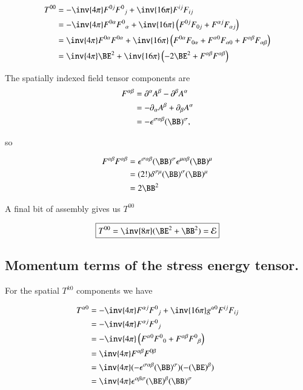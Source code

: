 \begin{align*}
T^{ 0 0 } 
&=
-\inv{4 \pi} F^{ 0 j} {F^0}_j + \inv{16 \pi} F^{i j} F_{i j} \\
&=
-\inv{4 \pi} F^{ 0 \alpha} {F^0}_\alpha + \inv{16 \pi} \left(
F^{0 j} F_{0 j} 
+F^{\alpha j} F_{\alpha j} 
\right)
\\
&=
\inv{4 \pi} F^{ 0 \alpha} F^{0 \alpha} + \inv{16 \pi} 
\left(
F^{0 \alpha} F_{0 \alpha} 
+F^{\alpha 0} F_{\alpha 0} 
+F^{\alpha \beta} F_{\alpha \beta} 
\right)
\\
&=
\inv{4 \pi} \BE^2 + \inv{16 \pi} \left(
-2 \BE^2 +F^{\alpha \beta} F^{\alpha \beta} 
\right)
\end{align*}

The spatially indexed field tensor components are
\begin{align*}
F^{\alpha \beta} 
&= \partial^\alpha A^\beta - \partial^\beta A^\alpha \\
&= -\partial_\alpha A^\beta + \partial_\beta A^\alpha \\
&= -\epsilon^{\sigma \alpha \beta} (\BB)^\sigma,
\end{align*}

so

\begin{align*}
F^{\alpha \beta} F^{\alpha \beta} 
&= 
\epsilon^{\sigma \alpha \beta} (\BB)^\sigma
\epsilon^{\mu \alpha \beta} (\BB)^\mu \\
&= (2!) \delta^{\sigma \mu} 
(\BB)^\sigma
(\BB)^\mu \\
&= 2 \BB^2
\end{align*}

A final bit of assembly gives us $T^{0 0}$

\begin{equation}\label{eqn:relativisticElectrodynamicsPS6:200}
\boxed{
T^{ 0 0 } = \inv{8 \pi} ( \BE^2 + \BB^2 ) = \mathcal{E}
}
\end{equation}

\subsection{Momentum terms of the stress energy tensor.}

For the spatial $T^{k 0}$ components we have

\begin{align*}
T^{\alpha 0} 
&= 
-\inv{4 \pi} F^{\alpha j} {F^0}_j + \inv{16 \pi} g^{\alpha 0} F^{i j} F_{i j} \\
&= 
-\inv{4 \pi} F^{\alpha j} {F^0}_j \\
&= 
-\inv{4 \pi} 
\left( 
F^{\alpha 0} {F^0}_0 
+F^{\alpha \beta} {F^0}_\beta 
\right) \\
&= 
\inv{4 \pi} F^{\alpha \beta} F^{0 \beta} \\
&= 
\inv{4 \pi} (-\epsilon^{\sigma \alpha \beta} (\BB)^\sigma) (-(\BE)^\beta) \\
&= 
\inv{4 \pi} \epsilon^{\alpha \beta \sigma} 
(\BE)^\beta 
(\BB)^\sigma
\\
\end{align*}

